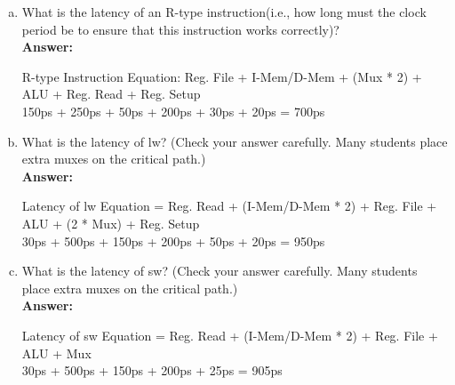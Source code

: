 \documentclass[11pt]{article}
\begin{document}
\begin{enumerate}[(a)]
    \item What is the latency of an R-type instruction(i.e., how long must the clock period be to ensure that this instruction works correctly)?\\
    \textbf{Answer:}
    \begin{center}
        R-type Instruction Equation: Reg. File + I-Mem/D-Mem + (Mux * 2) + ALU + Reg. Read + Reg. Setup\\
        150ps + 250ps + 50ps + 200ps + 30ps + 20ps = 700ps\\
    \end{center}
    
    \item What is the latency of lw? (Check your answer carefully. Many students place extra muxes on the critical path.)\\
    \textbf{Answer:}
    \begin{center}
        Latency of lw Equation = Reg. Read + (I-Mem/D-Mem * 2) + Reg. File + ALU + (2 * Mux) + Reg. Setup\\
        30ps + 500ps + 150ps + 200ps + 50ps + 20ps = 950ps\\
    \end{center}

    \item What is the latency of sw? (Check your answer carefully. Many students place extra muxes on the critical path.)\\
    \textbf{Answer:}
    \begin{center}
        Latency of sw Equation = Reg. Read + (I-Mem/D-Mem * 2) + Reg. File + ALU + Mux\\
        30ps + 500ps + 150ps + 200ps + 25ps = 905ps\\
    \end{center}


\end{enumerate}
\end{document}
